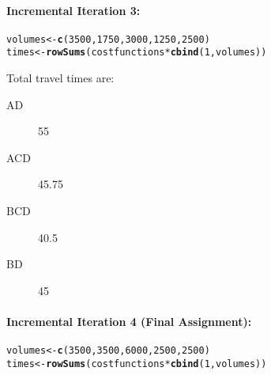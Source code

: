 \documentclass{texMemo}\usepackage[]{graphicx}\usepackage[]{color}
\makeatletter
\newcommand{\hlnum}[1]{\textcolor[rgb]{0.686,0.059,0.569}{#1}}%
\newcommand{\hlopt}[1]{\textcolor[rgb]{0,0,0}{#1}}%
\newcommand{\hlstd}[1]{\textcolor[rgb]{0.345,0.345,0.345}{#1}}%
\newcommand{\hlkwb}[1]{\textcolor[rgb]{0.69,0.353,0.396}{#1}}%
\newcommand{\hlkwd}[1]{\textcolor[rgb]{0.737,0.353,0.396}{\textbf{#1}}}%
\newenvironment{kframe}{%
 \def\at@end@of@kframe{}%
 \ifinner\ifhmode%
  \def\at@end@of@kframe{\end{minipage}}%
  \begin{minipage}{\columnwidth}%
 \fi\fi%
 \def\FrameCommand##1{\hskip\@totalleftmargin \hskip-\fboxsep
 \colorbox{shadecolor}{##1}\hskip-\fboxsep
     \hskip-\linewidth \hskip-\@totalleftmargin \hskip\columnwidth}%
 \MakeFramed {\advance\hsize-\width
   \@totalleftmargin\z@ \linewidth\hsize
   \@setminipage}}%
 {\par\unskip\endMakeFramed%
 \at@end@of@kframe}
\newenvironment{knitrout}{}{} %
\makeatother
\begin{document}
\begin{enumerate}
\paragraph{Incremental Iteration 3:}
\begin{knitrout}\small
{}\color{fgcolor}\begin{kframe}
\begin{alltt}
\hlstd{volumes} \hlkwb{<-} \hlkwd{c}\hlstd{(}\hlnum{3500}\hlstd{,}\hlnum{1750}\hlstd{,}\hlnum{3000}\hlstd{,}\hlnum{1250}\hlstd{,}\hlnum{2500}\hlstd{)}
\hlstd{times} \hlkwb{<-} \hlkwd{rowSums}\hlstd{(costfunctions} \hlopt{*} \hlkwd{cbind}\hlstd{(}\hlnum{1}\hlstd{, volumes))}
\end{alltt}
\end{kframe}
\end{knitrout}


\begin{center}
\end{center}
Total travel times are:
\begin{description}
\item[AD]{55}
\item[ACD]{45.75}
\item[BCD]{40.5}
\item[BD]{45}
\end{description}

\paragraph{Incremental Iteration 4 (Final Assignment):}
\begin{knitrout}\small
{}\color{fgcolor}\begin{kframe}
\begin{alltt}
\hlstd{volumes} \hlkwb{<-} \hlkwd{c}\hlstd{(}\hlnum{3500}\hlstd{,}\hlnum{3500}\hlstd{,}\hlnum{6000}\hlstd{,}\hlnum{2500}\hlstd{,}\hlnum{2500}\hlstd{)}
\hlstd{times} \hlkwb{<-} \hlkwd{rowSums}\hlstd{(costfunctions} \hlopt{*} \hlkwd{cbind}\hlstd{(}\hlnum{1}\hlstd{, volumes))}
\end{alltt}
\end{kframe}
\end{knitrout}



\end{enumerate}
\end{document}
